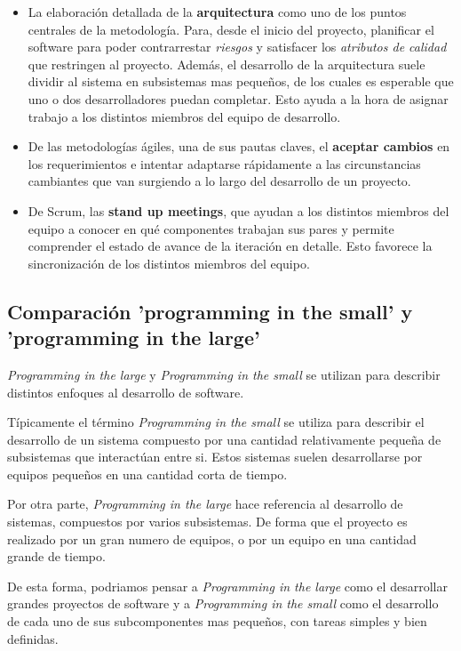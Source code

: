 \begin{itemize}
		\item La elaboración detallada de la \textbf{arquitectura} como uno de los puntos centrales de la metodología. Para, desde el inicio del proyecto, planificar el software para poder contrarrestar \emph{riesgos} y satisfacer los \emph{atributos de calidad} que restringen al proyecto. Además, el desarrollo de la arquitectura suele dividir al sistema en subsistemas mas pequeños, de los cuales es esperable que uno o dos desarrolladores puedan completar. Esto ayuda a la hora de asignar trabajo a los distintos miembros del equipo de desarrollo.

		\item De las metodologías ágiles, una de sus pautas claves, el \textbf{aceptar cambios} en los requerimientos e intentar adaptarse rápidamente a las circunstancias cambiantes que van surgiendo a lo largo del desarrollo de un proyecto.

		\item De Scrum, las \textbf{stand up meetings}, que ayudan a los distintos miembros del equipo a conocer en qué componentes trabajan sus pares y permite comprender el estado de avance de la iteración en detalle. Esto favorece la sincronización de los distintos miembros del equipo.

	\end{itemize}

\subsection{Comparación 'programming in the small' y 'programming in the large'}

	\newcommand{\pil}{
		\emph{Programming in the large}
	}

	\newcommand{\pis}{
		\emph{Programming in the small}
	}

	\pil y \pis se utilizan para describir distintos enfoques al desarrollo de software.

	Típicamente el término \pis se utiliza para describir el desarrollo de un sistema compuesto por una cantidad relativamente pequeña de subsistemas que interactúan entre si. Estos sistemas suelen desarrollarse por equipos pequeños en una cantidad corta de tiempo.

	Por otra parte, \pil hace referencia al desarrollo de sistemas, compuestos por varios subsistemas. De forma que el proyecto es realizado por un gran numero de equipos, o por un equipo en una cantidad grande de tiempo.

	De esta forma, podriamos pensar a \pil como el desarrollar grandes proyectos de software y a \pis como el desarrollo de cada uno de sus subcomponentes mas pequeños, con tareas simples y bien definidas.

